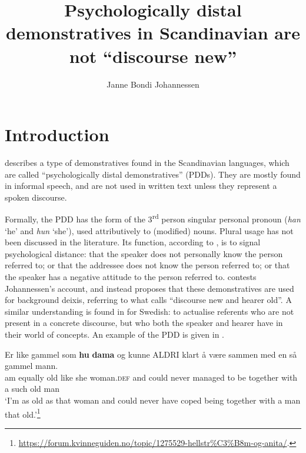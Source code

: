 \documentclass[output=paper,colorlinks,citecolor=brown]{langscibook}
\author{Janne Bondi Johannessen\affiliation{University of Oslo}\orcid{}}
\title{Psychologically distal demonstratives in Scandinavian are not “discourse new”}
\begin{document}
\maketitle
{}


\section{Introduction}\label{sec:johannessen:1}

\citet{Johannessen2008} describes a type of demonstratives found in the Scandinavian languages, which are called “psychologically distal demonstratives” (PDDs). They are mostly found in informal speech, and are not used in written text unless they represent a spoken discourse. 

Formally, the PDD has the form of the 3\textsuperscript{rd} person singular personal pronoun (\textit{han} ‘he’ and \textit{hun} ‘she’), used attributively to (modified) nouns. Plural usage has not been discussed in the literature. Its function, according to \citet{Johannessen2008}, is to signal psychological distance: that the speaker does not personally know the person referred to; or that the addressee does not know the person referred to; or that the speaker has a negative attitude to the person referred to. \citet{Lie2010} contests Johannessen’s account, and instead proposes that these demonstratives are used for background deixis, referring to what \citet{Diessel1999Book} calls “discourse new and hearer old”. A similar understanding is found in \citet[vol. 2: 317]{TelemanEtAl1999} for Swedish: to actualise referents who are not present in a concrete discourse, but who both the speaker and hearer have in their world of concepts. An example of the PDD is given in .

\ea\label{ex:johannessen:1}
 \gll Er like gammel som \textbf{hu} \textbf{dama} og kunne ALDRI klart å være sammen med en så gammel mann. \\
     am equally old like she woman.\textsc{def} and could never managed to be together with a such old man\\
\glt ‘I’m as old as that woman and could never have coped being together with a man that old.’\footnote{\url{https://forum.kvinneguiden.no/topic/1275529-hellstr\%C3\%B8m-og-anita/}.}
\z
\end{document}
